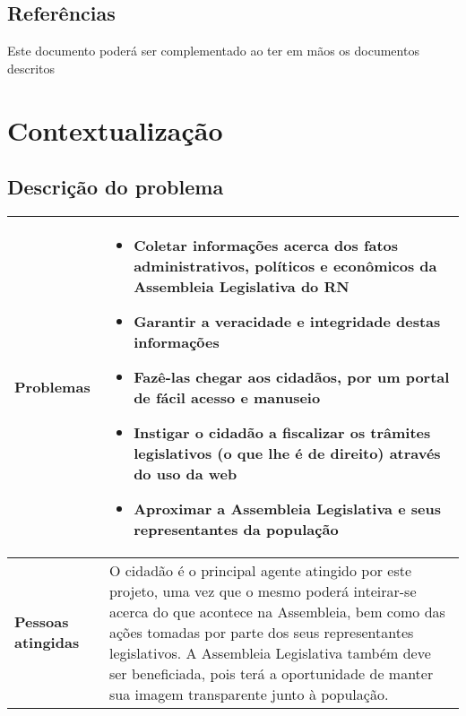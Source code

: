 \documentclass[12pt, a4paper]{article}
\begin{document}
        \subsection{Referências}
        {\color{red} Este documento poderá ser complementado ao ter em mãos os
        documentos descritos}

    \section{Contextualização}
        \subsection{Descrição do problema}
            \begin{tabu}{X[1] | X[3]}
                \hline

                \textbf{Problemas} &
                \begin{minipage}[t]{\linewidth}
                \begin{itemize}[itemsep=.5ex,parsep=.0ex,after=\strut]
                \item Coletar informações acerca dos fatos administrativos,
                    políticos e econômicos da Assembleia Legislativa do RN
                \item Garantir a veracidade e integridade destas informações
                \item Fazê-las chegar aos cidadãos, por um portal de fácil acesso
                    e manuseio
                \item Instigar o cidadão a fiscalizar os trâmites legislativos
                    (o que lhe é de direito) através do uso da web
                \item Aproximar a Assembleia Legislativa e seus representantes
                    da população
                \end{itemize}
                \end{minipage}
                \\ \hline

                \textbf{Pessoas atingidas} &
                O cidadão é o principal agente atingido por este projeto, uma
                vez que o mesmo poderá inteirar-se acerca do que acontece na
                Assembleia, bem como das ações tomadas por parte dos seus
                representantes legislativos. A Assembleia Legislativa também
                deve ser beneficiada, pois terá a oportunidade de manter sua
                imagem transparente junto à população.
                \\ \hline


\end{tabu}
\end{document}
